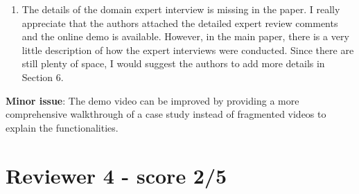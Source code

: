 \documentclass{article}
\begin{document}
\begin{itemize}
{\begin{enumerate}
    \item{The details of the domain expert interview is missing in the paper.  
    I really appreciate that the authors attached the detailed expert review comments
    and the online demo is available. However, in the main paper, there is a very
    little description of how the expert interviews were conducted. Since there are
    still plenty of space, I would suggest the authors to add more details in Section
    6.}
    \end{enumerate}
    \textbf{Minor issue}:
    The demo video can be improved by providing a more comprehensive walkthrough of a
    case study instead of fragmented videos to explain the functionalities.
}
\end{itemize}

\section{Reviewer 4 - score 2/5}
\end{document}

